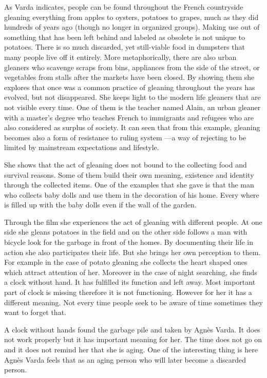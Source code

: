 As Varda indicates, people can be found throughout the French countryside gleaning everything from apples to oysters, potatoes to grapes, much as they did hundreds of years ago (though no longer in organized groups). Making use out of something that has been left behind and labeled as obsolete is not unique to potatoes. There is so much discarded, yet still-viable food in dumpsters that many people live off it entirely. More metaphorically, there are also urban gleaners who scavenge scraps from bins, appliances from the side of the street, or vegetables from stalls after the markets have been closed. By showing them she explores that once was a common practice of gleaning throughout the years has evolved, but not disappeared. She keeps light to the modern life gleaners that are not visible every time. One of them is the teacher named Alain, an urban gleaner with a master’s degree who teaches French to immigrants and refugees who are also considered as surplus of society. It can seen that from this example, gleaning becomes also a form of resistance to ruling system ---a way of rejecting to be limited by mainstream expectations and lifestyle.

She shows that the act of gleaning does not bound to the collecting food and survival reasons. Some of them build their own meaning, existence and identity through the collected items. One of the examples that she gave is that the man who collects baby dolls and use them in the decoration of his home. Every where is filled up with the baby dolls even if the wall of the garden.

Through the film she experiences the act of gleaning with different people. At one side she gleans potatoes in the field and on the other side follows a man with bicycle look for the garbage in front of the homes. By documenting their life in action she also participates their life. But she brings her own perception to them. For example in the case of potato gleaning she collects the heart shaped ones which attract attention of her. Moreover in the case of night searching, she finds a clock without hand. It has fulfilled its function and left away. Most important part of clock is missing therefore it is not functioning. However for her it has a different meaning. Not every time people seek to be aware of time sometimes they want to forget that.

A clock without hands found the garbage pile and taken by Agnès Varda. It does not work properly but it has important meaning for her. The time does not go on and it does not remind her that she is aging. One of the interesting thing is here Agnès Varda feels that as an aging person who will later become a discarded person.

